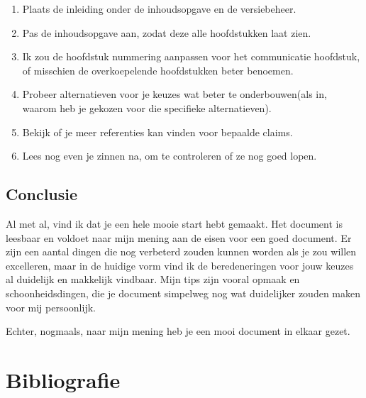 \documentclass[a4paper]{report}
\begin{document}
\begin{enumerate}
  \item Plaats de inleiding onder de inhoudsopgave en de versiebeheer.
  \item Pas de inhoudsopgave aan, zodat deze alle hoofdstukken laat zien.
  \item Ik zou de hoofdstuk nummering aanpassen voor het communicatie hoofdstuk, of misschien de overkoepelende hoofdstukken beter benoemen.
  \item Probeer alternatieven voor je keuzes wat beter te onderbouwen(als in, waarom heb je gekozen voor die specifieke alternatieven).
  \item Bekijk of je meer referenties kan vinden voor bepaalde claims.
  \item Lees nog even je zinnen na, om te controleren of ze nog goed lopen.
\end{enumerate}

\section{Conclusie}
Al met al, vind ik dat je een hele mooie start hebt gemaakt. Het document is leesbaar en voldoet naar mijn mening aan de eisen voor een goed document. 
Er zijn een aantal dingen die nog verbeterd zouden kunnen worden als je zou willen excelleren, maar in de huidige vorm vind ik de beredeneringen voor jouw keuzes al duidelijk en makkelijk vindbaar.
Mijn tips zijn vooral opmaak en schoonheidsdingen, die je document simpelweg nog wat duidelijker zouden maken voor mij persoonlijk. 
\par\smallskip
Echter, nogmaals, naar mijn mening heb je een mooi document in elkaar gezet.

\chapter{Bibliografie}
\begingroup
\renewcommand{\chapter}[2]{} %
\renewcommand{\addcontentsline}[3]{} %


\endgroup

\end{document}
